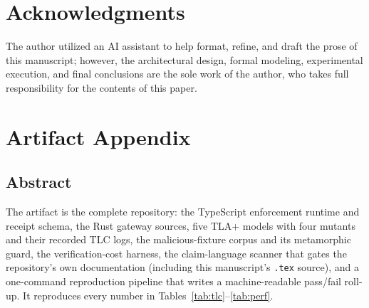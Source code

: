 \documentclass[10pt,twocolumn,letterpaper]{article}
\begin{document}
\section*{Acknowledgments}
The author utilized an AI assistant to help format, refine, and draft the prose of this manuscript; however, the architectural design, formal modeling, experimental execution, and final conclusions are the sole work of the author, who takes full responsibility for the contents of this paper.
\appendix
\section{Artifact Appendix}
\label{sec:appendix}

\subsection{Abstract}
The artifact is the complete repository: the TypeScript enforcement runtime
and receipt schema, the Rust gateway sources, five TLA+ models with four
mutants and their recorded TLC logs, the malicious-fixture corpus and its
metamorphic guard, the verification-cost harness, the claim-language scanner
that gates the repository's own documentation (including this manuscript's
\texttt{.tex} source), and a one-command reproduction pipeline that writes a
machine-readable pass/fail roll-up. It reproduces every number in
Tables~\ref{tab:tlc}--\ref{tab:perf}.
\end{document}
